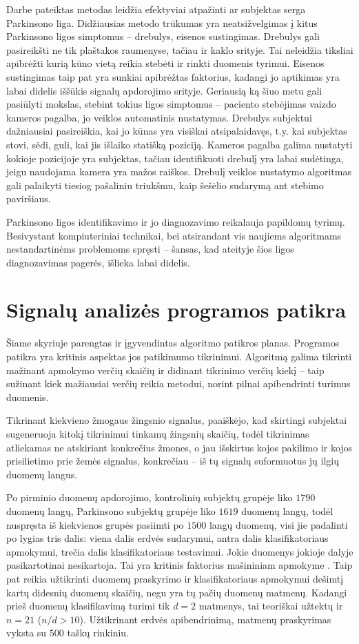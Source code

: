 \documentclass[]{vgtuef}
\begin{document}
Darbe pateiktas metodas leidžia efektyviai atpažinti ar subjektas serga Parkinsono liga. Didžiausias metodo trūkumas yra neatsižvelgimas į kitus Parkinsono ligos simptomus -- drebulys, eisenos sustingimas. Drebulys gali pasireikšti ne tik plaštakos raumenyse, tačiau ir kaklo srityje. Tai neleidžia tiksliai apibrėžti kurią kūno vietą reikia stebėti ir rinkti duomenis tyrimui. Eisenos sustingimas taip pat yra sunkiai apibrėžtas faktorius, kadangi jo aptikimas yra labai didelis iššūkis signalų apdorojimo srityje. Geriausią ką šiuo metu gali pasiūlyti mokslas, stebint tokius ligos simptomus -- paciento stebėjimas vaizdo kameros pagalba, jo veiklos automatinis nustatymas. Drebulys subjektui dažniausiai pasireiškia, kai jo kūnas yra visiškai atsipalaidavęs, t.y. kai subjektas stovi, sėdi, guli, kai jis išlaiko statišką poziciją. Kameros pagalba galima nustatyti kokioje pozicijoje yra subjektas, tačiau identifikuoti drebulį yra labai sudėtinga, jeigu naudojama kamera yra mažos raiškos. Drebulį veiklos nustatymo algoritmas gali palaikyti tiesiog pašaliniu triukšmu, kaip šešėlio sudarymą ant stebimo paviršiaus. 

Parkinsono ligos identifikavimo ir jo diagnozavimo reikalauja papildomų tyrimų. Besivystant kompiuteriniai technikai, bei atsirandant vis naujiems algoritmams nestandartinėms problemoms spręsti -- šansas, kad ateityje šios ligos diagnozavimas pagerės, išlieka labai didelis.

\section{Signalų analizės programos patikra}

Šiame skyriuje parengtas ir įgyvendintas algoritmo patikros planas. Programos patikra yra kritinis aspektas jos patikimumo tikrinimui. Algoritmą galima tikrinti mažinant apmokymo verčių skaičių ir didinant tikrinimo verčių kiekį -- taip sužinant kiek mažiausiai verčių reikia metodui, norint pilnai apibendrinti turimus duomenis.

Tikrinant kiekvieno žmogaus žingsnio signalus, paaiškėjo, kad skirtingi subjektai sugeneruoja kitokį tikrinimui tinkamų žingsnių skaičių, todėl tikrinimas atliekamas ne atskiriant konkrečius žmones, o jau išskirtus kojos pakilimo ir kojos prisilietimo prie žemės signalus, konkrečiau -- iš tų signalų suformuotus jų ilgių duomenų langus.

Po pirminio duomenų apdorojimo, kontrolinių subjektų grupėje liko $1790$ duomenų langų, Parkinsono subjektų grupėje liko $1619$ duomenų langų, todėl nuspręsta iš kiekvienos grupės pasiimti po $1500$ langų duomenų, visi jie padalinti po lygias tris dalis: viena dalis erdvės sudarymui, antra dalis klasifikatoriaus apmokymui, trečia dalis klasifikatoriaus testavimui. Jokie duomenys jokioje dalyje pasikartotinai nesikartoja. Tai yra kritinis faktorius mašininiam apmokyme \cite{824819}. Taip pat reikia užtikrinti duomenų praskyrimo ir klasifikatoriaus apmokymui dešimtį kartų didesnių duomenų skaičių, negu yra tų pačių duomenų matmenų. Kadangi prieš duomenų klasifikavimą turimi tik $d=2$ matmenys, tai teoriškai užtektų ir $n=21$ ($n/d > 10$). Užtikrinant erdvės apibendrinimą, matmenų praskyrimas vyksta su $500$ taškų rinkiniu. 
\end{document}
